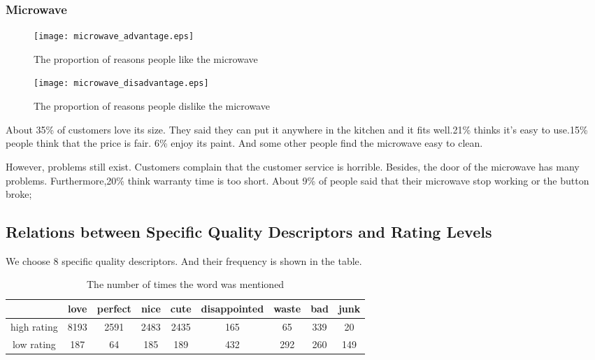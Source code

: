 \documentclass{mcmthesis}
\begin{document}
	\subsubsection{Microwave}
	\begin{figure}[H]
		\begin{minipage}[t]{0.5\textwidth}
			\centering
			\texttt{[image: microwave\_advantage.eps]}
			\caption{The proportion of reasons people like the microwave\label{fig:1}}
		\end{minipage}
		\qquad
		\begin{minipage}[t]{0.5\textwidth}
			\centering
			\texttt{[image: microwave\_disadvantage.eps]}
			\caption{The proportion of reasons people dislike the microwave\label{fig:2}}
		\end{minipage}
	\end{figure}
	\begin{flushleft}
		About 35\% of customers love its size. They said they can put it anywhere in the kitchen and it fits well.21\% thinks it's easy to use.15\% people think that the price is fair.
		6\% enjoy its paint. And some other people find the microwave easy to clean.
	\end{flushleft}
	\begin{flushleft}
		However, problems still exist. Customers complain that the customer service is horrible. Besides, the door of the microwave has many problems. Furthermore,20\% think warranty time is too short. About 9\% of people said that their microwave stop working or the button broke;
	\end{flushleft}
	
	
	\subsection{Relations between Specific Quality Descriptors and Rating Levels}
	We choose 8 specific quality descriptors. And their frequency is shown in the table.
	\begin{table}[H]
		\centering
		\caption{The number of times the word was mentioned}
		\begin{tabular}{|c|c|c|c|c|c|c|c|c|}
			\hline 
			& love & perfect & nice & cute & disappointed & waste & bad & junk \\ 
			\hline 
			high rating & 8193 & 2591 & 2483 & 2435 & 165 & 65 & 339 & 20 \\ 
			\hline 
			low rating & 187 & 64 & 185 & 189 & 432 & 292 & 260 & 149 \\ 
			\hline 
		\end{tabular}
	\end{table}
	
\end{document}
